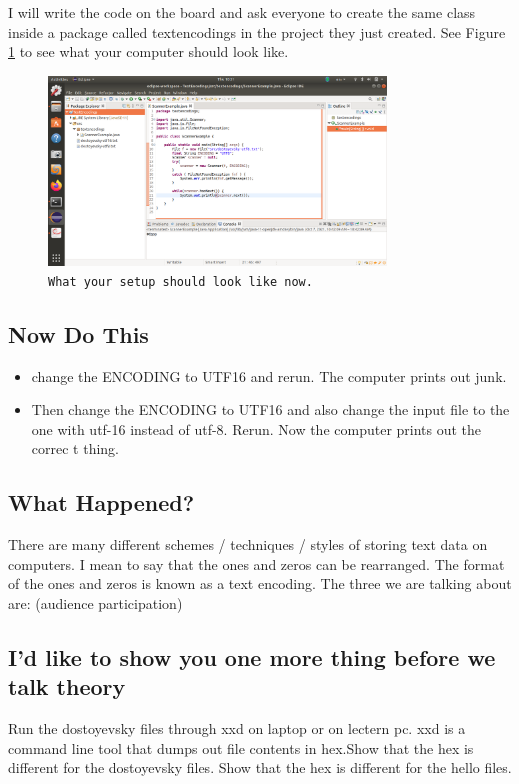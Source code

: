 \documentclass[12pt]{article}
\begin{document}
I will write the code on the board and ask everyone to create the same class
inside a package called textencodings in the project they just created.
See Figure \ref{fig:environment} to see what your computer should look like.



\begin{figure}[h]
\centering
	\includegraphics[width=0.8\textwidth]{environment.png}
	\caption{{\small \texttt{What your setup should look like now.}}}
	\label{fig:environment}
\end{figure}


\subsection{Now Do This}
\begin{itemize}
\item change the ENCODING to UTF16 and rerun. The computer prints out junk.
\item Then change the ENCODING to UTF16 and also change the input file to the
one with utf-16 instead of utf-8. Rerun. Now the computer prints out the correc
t thing.
\end{itemize}

\subsection{What Happened?}
There are many different schemes / techniques / styles of storing text data on
computers. I mean to say that the ones and zeros can be rearranged. The format
of the ones and zeros is known as a text encoding. The three we are talking
about are: (audience participation)

\subsection{I'd like to show you one more thing before we talk theory}
Run the dostoyevsky files through xxd on laptop or on lectern pc. xxd is a
command line tool that dumps out file contents in hex.Show that the hex is
different for the dostoyevsky files. Show that the hex is different for the
hello files.
\end{document}
